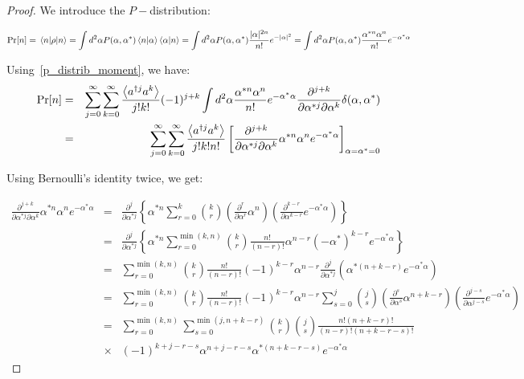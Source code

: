 \begin{proof}
We introduce the $P-$distribution:

\begin{equation}
    \text{Pr}[n] = \mel{n}{\rho}{n} = \int d^2 \alpha P(\alpha, \alpha^*) \braket{n}{\alpha} \braket{\alpha}{n} = \int d^2 \alpha P(\alpha, \alpha^*) \frac{|\alpha|^{2 n}}{n!} e^{-|\alpha|^2} = \int d^2 \alpha P(\alpha, \alpha^*) \frac{\alpha^{* n} \alpha^{n}}{n!} e^{-\alpha^* \alpha}
\end{equation}

Using~\autoref{p_distrib_moment}, we have:
\begin{eqnarray}
    \text{Pr}[n] &=& \sum_{j=0}^\infty \sum_{k=0}^\infty \frac{\left\langle a^{\dagger j} a^k \right\rangle}{j! k!} (-1)^{j+k} \int d^2 \alpha \frac{\alpha^{* n} \alpha^{n}}{n!} e^{-\alpha^* \alpha} \frac{\partial^{j+k}}{\partial \alpha^{* j} \partial \alpha^k}  \delta(\alpha, \alpha^*)\nonumber\\
    &=& \sum_{j=0}^\infty \sum_{k=0}^\infty \frac{\left\langle a^{\dagger j} a^k \right\rangle}{j! k! n!} \left[\frac{\partial^{j+k}}{\partial \alpha^{* j} \partial \alpha^k} \alpha^{* n} \alpha^{n} e^{-\alpha^* \alpha} \right]_{\alpha = \alpha^* = 0}\nonumber
\end{eqnarray}

Using Bernoulli's identity twice, we get:

\begin{eqnarray}
    \frac{\partial^{j+k}}{\partial \alpha^{* j} \partial \alpha^k} \alpha^{* n} \alpha^{n} e^{-\alpha^* \alpha} &=& \frac{\partial^j}{\partial \alpha^{* j}} \left\{\alpha^{* n} \sum_{r = 0}^{k} \binom{k}{r} \left(\frac{\partial^r}{\partial \alpha^{r}} \alpha^{n}\right) \left(\frac{\partial^{k-r}}{\partial \alpha^{k-r}} e^{-\alpha^* \alpha}\right) \right\}\nonumber\\
    &=& \frac{\partial^j}{\partial \alpha^{* j}} \left\{\alpha^{* n} \sum_{r = 0}^{\min(k,n)} \binom{k}{r} \frac{n!}{(n-r)!} \alpha^{n-r} (-\alpha^*)^{k-r} e^{-\alpha^* \alpha}\right\}\nonumber\\
    &=& \sum_{r = 0}^{\min(k,n)} \binom{k}{r} \frac{n!}{(n-r)!} (-1)^{k-r} \alpha^{n-r} \frac{\partial^j}{\partial \alpha^{* j}}\left(\alpha^{* (n+k-r)} e^{-\alpha^* \alpha}\right)\nonumber\\
    &=& \sum_{r = 0}^{\min(k,n)} \binom{k}{r} \frac{n!}{(n-r)!} (-1)^{k-r} \alpha^{n-r} \sum_{s = 0}^{j} \binom{j}{s} \left(\frac{\partial^s}{\partial \alpha^{s}} \alpha^{n+k-r}\right) \left(\frac{\partial^{j-s}}{\partial \alpha^{j-s}} e^{-\alpha^* \alpha}\right)\nonumber\\
    &=& \sum_{r = 0}^{\min(k,n)} \sum_{s = 0}^{\min(j,n+k-r)} \binom{k}{r} \binom{j}{s} \frac{n! (n+k-r)!}{(n-r)! (n+k-r-s)!} \nonumber\\ &\times& (-1)^{k+j-r-s} \alpha^{n+j-r-s} \alpha^{* (n+k-r-s)} e^{-\alpha^* \alpha}
\end{eqnarray}


\end{proof}
